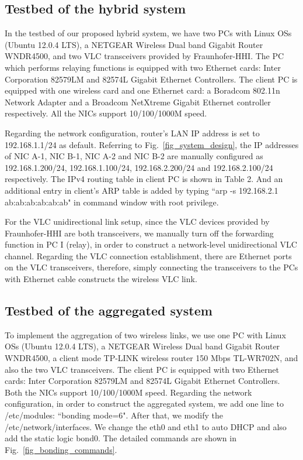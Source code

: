 \documentclass[10pt,journal]{IEEEtran}
\begin{document}
\subsection{Testbed of the hybrid system}
In the testbed of our proposed hybrid system, we have two PCs with Linux OSs (Ubuntu 12.0.4 LTS), a NETGEAR Wireless Dual band Gigabit Router WNDR4500, and two VLC transceivers provided by Fraunhofer-HHI. The PC which performs relaying functions is equipped with two Ethernet cards: Inter Corporation 82579LM and 82574L Gigabit Ethernet Controllers. The client PC is equipped with one wireless card and one Ethernet card: a Boradcom 802.11n Network Adapter and a Broadcom NetXtreme Gigabit Ethernet controller respectively. All the NICs support 10/100/1000M speed.

Regarding the network configuration, router's LAN IP address is set to 192.168.1.1/24 as default. Referring to Fig.~\ref{fig_system_design}, the IP addresses of NIC A-1, NIC B-1, NIC A-2 and NIC B-2 are manually configured as 192.168.1.200/24, 192.168.1.100/24, 192.168.2.200/24 and 192.168.2.100/24 respectively. The IPv4 routing table in client PC is shown in Table 2. And an additional entry in client's ARP table is added by typing ``arp -s 192.168.2.1 ab:ab:ab:ab:ab:ab" in command window with root privilege.

For the VLC unidirectional link setup, since the VLC devices provided by Fraunhofer-HHI are both transceivers, we manually turn off the forwarding function in PC I (relay), in order to construct a network-level unidirectional VLC channel. Regarding the VLC connection establishment, there are Ethernet ports on the VLC transceivers, therefore, simply connecting the transceivers to the PCs with Ethernet cable constructs the wireless VLC link.

\subsection{Testbed of the aggregated system}
To implement the aggregation of two wireless links, we use one PC with Linux OSs (Ubuntu 12.0.4 LTS), a NETGEAR Wireless Dual band Gigabit Router WNDR4500, a client mode  TP-LINK wireless router 150 Mbps TL-WR702N, and also the two VLC transceivers. The client PC is equipped with two Ethernet cards: Inter Corporation 82579LM and 82574L Gigabit Ethernet Controllers. Both the NICs support 10/100/1000M speed.
Regarding the network configuration, in order to construct the aggregated system, we add one line to /etc/modules: ``bonding mode=6". After that, we modify the /etc/network/interfaces. We change the eth0 and eth1 to auto DHCP and also add the static logic bond0. The detailed commands are shown in Fig.~\ref{fig_bonding_commands}.
\end{document}
